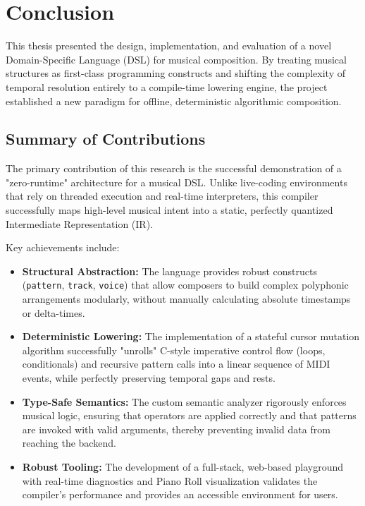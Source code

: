 \chapter{Conclusion}\label{ch:conclusion}

This thesis presented the design, implementation, and evaluation of a novel Domain-Specific Language (DSL)
for musical composition.
By treating musical structures as first-class programming constructs and shifting the complexity of temporal
resolution entirely to a compile-time lowering engine, the project established a new paradigm for offline,
deterministic algorithmic composition.

\section{Summary of Contributions}

The primary contribution of this research is the successful demonstration of a "zero-runtime" architecture
for a musical DSL.
Unlike live-coding environments that rely on threaded execution and real-time interpreters, this compiler
successfully maps high-level musical intent into a static, perfectly quantized Intermediate Representation (IR).

Key achievements include:
\begin{itemize}
  \item \textbf{Structural Abstraction:} The language provides robust constructs (\texttt{pattern},
    \texttt{track}, \texttt{voice}) that allow composers to build complex polyphonic arrangements modularly,
    without manually calculating absolute timestamps or delta-times.
  \item \textbf{Deterministic Lowering:} The implementation of a stateful cursor mutation algorithm
    successfully "unrolls" C-style imperative control flow (loops, conditionals) and recursive pattern calls
    into a linear sequence of MIDI events, while perfectly preserving temporal gaps and rests.
  \item \textbf{Type-Safe Semantics:} The custom semantic analyzer rigorously enforces musical logic,
    ensuring that operators are applied correctly and that patterns are invoked with valid arguments, thereby
    preventing invalid data from reaching the backend.
  \item \textbf{Robust Tooling:} The development of a full-stack, web-based playground with real-time
    diagnostics and Piano Roll visualization validates the compiler's performance and provides an accessible
    environment for users.
\end{itemize}

